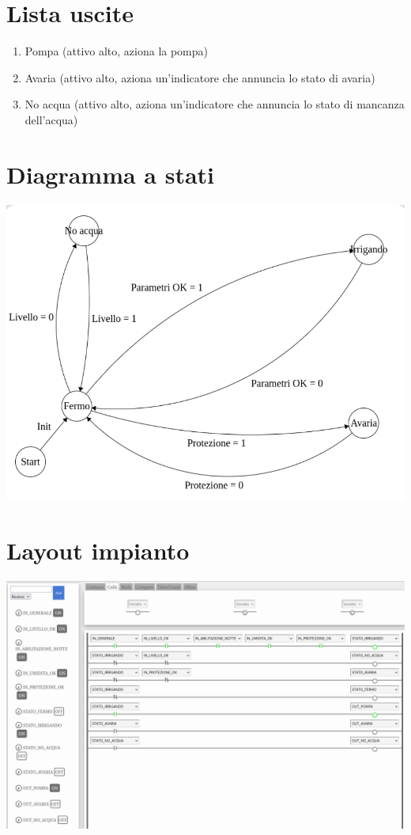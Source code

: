 \documentclass{article}
\begin{document}
    \section{Lista uscite}

    \begin{enumerate}
        \item Pompa (attivo alto, aziona la pompa)
        \item Avaria (attivo alto, aziona un'indicatore che annuncia lo stato di avaria)
        \item No acqua (attivo alto, aziona un'indicatore che annuncia lo stato di mancanza dell'acqua)
    \end{enumerate}

    \section{Diagramma a stati}

    \begin{center}
        \includegraphics[width=\textwidth]{irrigazione_stati.png}
    \end{center}

    \section{Layout impianto}

    \begin{center}
        \includegraphics[width=\textwidth]{esercizio_irrigazione.png}
    \end{center}
\end{document}
